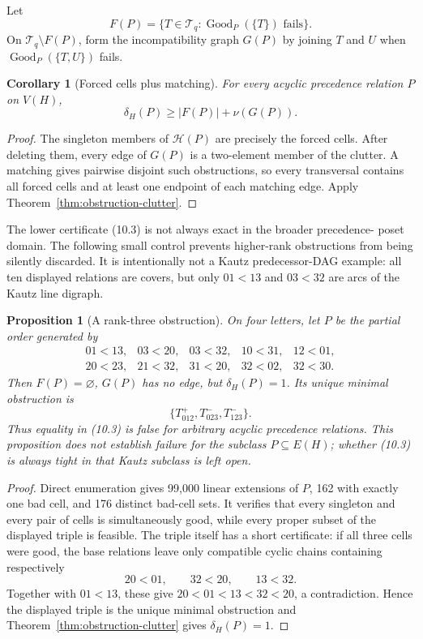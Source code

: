 \documentclass[11pt,a4paper]{article}
\newtheorem{proposition}[theorem]{Proposition}
\newtheorem{corollary}[theorem]{Corollary}
\theoremstyle{remark}
\begin{document}
Let
\[
 F(P)=\{T\in\mathcal T_q:\operatorname{Good}_P(\{T\})\text{ fails}\}.
\]
On \(\mathcal T_q\setminus F(P)\), form the incompatibility graph \(G(P)\)
by joining \(T\) and \(U\) when
\(\operatorname{Good}_P(\{T,U\})\) fails.

\begin{corollary}[Forced cells plus matching]
\label{cor:forced-matching}
For every acyclic precedence relation \(P\) on \(V(H)\),
\[
 \delta_H(P)\geq |F(P)|+\nu(G(P)).                       \tag{10.3}
\]
\end{corollary}

\begin{proof}
The singleton members of \(\mathcal H(P)\) are precisely the forced cells.
After deleting them, every edge of \(G(P)\) is a two-element member of the
clutter.  A matching gives pairwise disjoint such obstructions, so every
transversal contains all forced cells and at least one endpoint of each
matching edge.  Apply Theorem~\ref{thm:obstruction-clutter}.
\end{proof}

The lower certificate (10.3) is not always exact in the broader precedence-
poset domain.  The following small control prevents higher-rank obstructions
from being silently discarded.  It is intentionally not a Kautz
predecessor-DAG example: all ten displayed relations are covers, but only
\(01<13\) and \(03<32\) are arcs of the Kautz line digraph.

\begin{proposition}[A rank-three obstruction]
\label{prop:rank-three-obstruction}
On four letters, let \(P\) be the partial order generated by
\[
\begin{array}{lllll}
01<13,&03<20,&03<32,&10<31,&12<01,\\
20<23,&21<32,&31<20,&32<02,&32<30.
\end{array}                                             \tag{10.4}
\]
Then \(F(P)=\varnothing\), \(G(P)\) has no edge, but
\(\delta_H(P)=1\).  Its unique minimal obstruction is
\[
 \{T^+_{012},T^-_{023},T^-_{123}\}.
\]
Thus equality in (10.3) is false for arbitrary acyclic precedence relations.
This proposition does not establish failure for the subclass
\(P\subseteq E(H)\); whether (10.3) is always tight in that Kautz subclass is
left open.
\end{proposition}

\begin{proof}
Direct enumeration gives 99,000 linear extensions of \(P\), 162 with exactly
one bad cell, and 176 distinct bad-cell sets.  It verifies that every singleton
and every pair of cells is simultaneously good, while every proper subset of
the displayed triple is feasible.  The triple itself has a short certificate:
if all three cells were good, the base relations leave only compatible cyclic
chains containing respectively
\[
 20<01,\qquad32<20,\qquad13<32.
\]
Together with \(01<13\), these give
\(20<01<13<32<20\), a contradiction.  Hence the displayed triple is the
unique minimal obstruction and Theorem~\ref{thm:obstruction-clutter} gives
\(\delta_H(P)=1\).
\end{proof}
\end{document}
